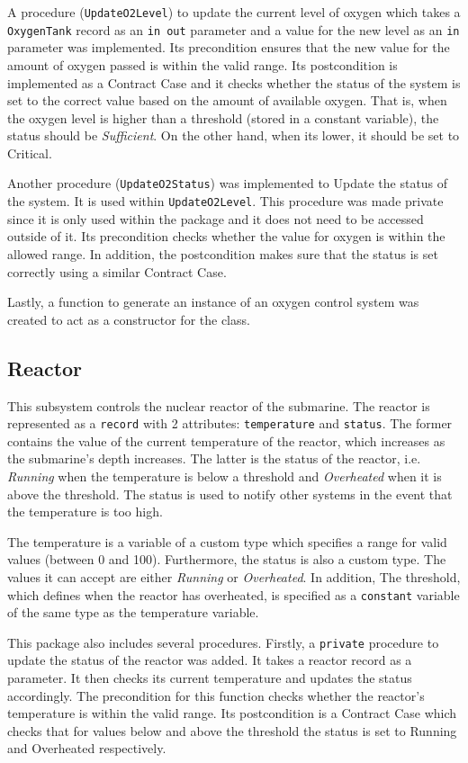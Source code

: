 \documentclass{llncs}
\begin{document}
A procedure (\texttt{UpdateO2Level}) to update the current level of oxygen which takes a \texttt{OxygenTank} record as an \texttt{in out} parameter and a value for the new level as an \texttt{in} parameter was implemented. Its precondition ensures that the new value for the amount of oxygen passed is within the valid range. Its postcondition is implemented as a Contract Case and it checks whether the status of the system is set to the correct value based on the amount of available oxygen. That is, when the oxygen level is higher than a threshold (stored in a constant variable), the status should be \textit{Sufficient}. On the other hand, when its lower, it should be set to Critical.

Another procedure (\texttt{UpdateO2Status}) was implemented to Update the status of the system. It is used within \texttt{UpdateO2Level}. This procedure was made private since it is only used within the package and it does not need to be accessed outside of it. Its precondition checks whether the value for oxygen is within the allowed range. In addition, the postcondition makes sure that the status is set correctly using a similar Contract Case.

Lastly, a function to generate an instance of an oxygen control system was created to act as a constructor for the class.

\subsection{Reactor}
This subsystem controls the nuclear reactor of the submarine. 
The reactor is represented as a \texttt{record} with 2 attributes: \texttt{temperature} and \texttt{status}. The former contains the value of the current temperature of the reactor, which increases as the submarine's depth increases. The latter is the status of the reactor, i.e. \textit{Running} when the temperature is below a threshold and \textit{Overheated} when it is above the threshold. The status is used to notify other systems in the event that the temperature is too high.

The temperature is a variable of a custom type which specifies a range for valid values (between 0 and 100). Furthermore, the status is also a custom type. The values it can accept are either \textit{Running} or \textit{Overheated}. In addition, The threshold, which defines when the reactor has overheated, is specified as a \texttt{constant} variable of the same type as the temperature variable.

This package also includes several procedures. Firstly, a \texttt{private} procedure to update the status of the reactor was added. It takes a reactor record as a parameter. It then checks its current temperature and updates the status accordingly. The precondition for this function checks whether the reactor's temperature is within the valid range. Its postcondition is a Contract Case which checks that for values below and above the threshold the status is set to Running and Overheated respectively. 
\end{document}
